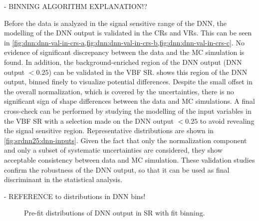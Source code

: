 - BINNING ALGORITHM EXPLANATION!?

Before the data is analyzed in the signal sensitive range of the DNN, the modelling of the DNN output is validated in the CRs and VRs. This can be seen in \cref{fig:dnn:dnn-val-in-crs-a,fig:dnn:dnn-val-in-crs-b,fig:dnn:dnn-val-in-crs-c}. No evidence of significant discrepancy between the data and the MC simulation is found. In addition, the background-enriched region of the DNN output (DNN output $< 0.25$) can be validated in the VBF SR.  shows this region of the DNN output, binned finely to visualize potential differences. 
Despite the small offset in the overall normalization, which is covered by the uncertainties, there is no significant sign of shape differences between the data and MC simulations. 
A final cross-check can be performed by studying the modelling of the input variables in the VBF SR with a selection made on the DNN output $< 0.25$ to avoid revealing the signal sensitive region. Representative distributions are shown in \cref{fig:srdnn25:dnn-inputs}.
Given the fact that only the normalization component and only a subset of systematic uncertainties are considered, they show acceptable consistency between data and MC simulation. 
These validation studies confirm the robustness of the DNN output, so that it can be used as final discriminant in the statistical analysis. 

- REFERENCE to distributions in DNN bins!


\begin{figure}[ht]
    \centering
    {\caption{Pre-fit distributions of DNN output in SR with fit binning.
            \label{fig:dnn:dnn-val-in-crs} }}
\end{figure}


